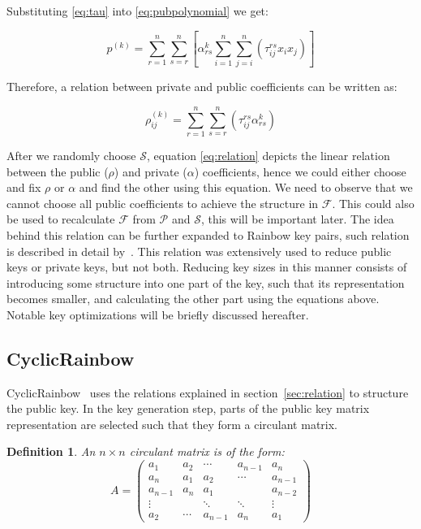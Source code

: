 \documentclass{ufsctex/ufsctex}
\newtheorem{definition}{Definition}
\begin{document}
Substituting \ref{eq:tau} into \ref{eq:pubpolynomial} we get:

\begin{equation}
p^{(k)} = \sum_{r=1}^n \sum_{s=r}^n
\left[
\alpha^{k}_{rs} \sum_{i=1}^{n}\sum_{j=i}^n \left( \tau^{rs}_{ij} x_i x_j \right)
\right]
\end{equation}

Therefore, a relation between private and public coefficients can be written as:

\begin{equation}\label{eq:relation}
\rho^{(k)}_{ij} = \sum_{r=1}^{n}\sum_{s=r}^n
\left( \tau^{rs}_{ij} \alpha^{k}_{rs} \right)
\end{equation}

After we randomly choose $\mathcal{S}$, equation \ref{eq:relation} depicts the
linear relation between the public ($\rho$) and private ($\alpha$)
coefficients, hence we could either choose and fix $\rho$ or $\alpha$ and find
the other using this equation. We need to observe that we cannot choose all
public coefficients to achieve the structure in $\mathcal{F}$. This could also
be used to recalculate $\mathcal{F}$ from $\mathcal{P}$ and $\mathcal{S}$, this
will be important later. The idea behind this relation can be further expanded
to Rainbow key pairs, such relation is described in detail
by~\cite{petzoldt2011small}. This relation was extensively used to reduce
public keys or private keys, but not both. Reducing key sizes in this manner
consists of introducing some structure into one part of the key, such that its
representation becomes smaller, and calculating the other part using the
equations above. Notable key optimizations will be briefly discussed hereafter.



\subsection{CyclicRainbow}

CyclicRainbow~\cite{petzoldt2010cyclicrainbow} uses the relations explained in
section~\ref{sec:relation} to structure the public key. In the key generation
step, parts of the public key matrix representation are selected such that they
form a circulant matrix.

\begin{definition}
An $n \times n$ circulant matrix is of the form:
\begin{equation}
A =
\begin{pmatrix}
a_1     & a_2    & \cdots  & a_{n-1} & a_n     \\
a_n     & a_1    & a_2     & \cdots  & a_{n-1} \\
a_{n-1} & a_n    & a_1     &         & a_{n-2} \\
\vdots  &        & \ddots  & \ddots  & \vdots  \\
a_2     & \cdots & a_{n-1} & a_n     & a_1
\end{pmatrix}
\end{equation}
\end{definition}
\end{document}
